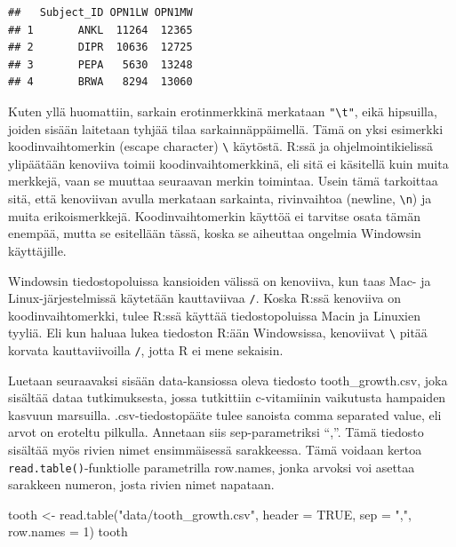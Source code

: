 \documentclass[
]{book}
\newenvironment{Shaded}{\begin{snugshade}}{\end{snugshade}}
\newcommand{\AttributeTok}[1]{\textcolor[rgb]{0.77,0.63,0.00}{#1}}
\newcommand{\ConstantTok}[1]{\textcolor[rgb]{0.00,0.00,0.00}{#1}}
\newcommand{\DecValTok}[1]{\textcolor[rgb]{0.00,0.00,0.81}{#1}}
\newcommand{\FunctionTok}[1]{\textcolor[rgb]{0.00,0.00,0.00}{#1}}
\newcommand{\NormalTok}[1]{#1}
\newcommand{\OtherTok}[1]{\textcolor[rgb]{0.56,0.35,0.01}{#1}}
\newcommand{\StringTok}[1]{\textcolor[rgb]{0.31,0.60,0.02}{#1}}
\begin{document}
\begin{verbatim}
##   Subject_ID OPN1LW OPN1MW
## 1       ANKL  11264  12365
## 2       DIPR  10636  12725
## 3       PEPA   5630  13248
## 4       BRWA   8294  13060
\end{verbatim}

Kuten yllä huomattiin, sarkain erotinmerkkinä merkataan \texttt{"\textbackslash{}t"}, eikä hipsuilla, joiden sisään laitetaan tyhjää tilaa sarkainnäppäimellä. Tämä on yksi esimerkki koodinvaihtomerkin (escape character) \texttt{\textbackslash{}} käytöstä. R:ssä ja ohjelmointikielissä ylipäätään kenoviiva toimii koodinvaihtomerkkinä, eli sitä ei käsitellä kuin muita merkkejä, vaan se muuttaa seuraavan merkin toimintaa. Usein tämä tarkoittaa sitä, että kenoviivan avulla merkataan sarkainta, rivinvaihtoa (newline, \texttt{\textbackslash{}n}) ja muita erikoismerkkejä. Koodinvaihtomerkin käyttöä ei tarvitse osata tämän enempää, mutta se esitellään tässä, koska se aiheuttaa ongelmia Windowsin käyttäjille.

Windowsin tiedostopoluissa kansioiden välissä on kenoviiva, kun taas Mac- ja Linux-järjestelmissä käytetään kauttaviivaa \texttt{/}. Koska R:ssä kenoviiva on koodinvaihtomerkki, tulee R:ssä käyttää tiedostopoluissa Macin ja Linuxien tyyliä. Eli kun haluaa lukea tiedoston R:ään Windowsissa, kenoviivat \texttt{\textbackslash{}} pitää korvata kauttaviivoilla \texttt{/}, jotta R ei mene sekaisin.

Luetaan seuraavaksi sisään data-kansiossa oleva tiedosto tooth\_growth.csv, joka sisältää dataa tutkimuksesta, jossa tutkittiin c-vitamiinin vaikutusta hampaiden kasvuun marsuilla. .csv-tiedostopääte tulee sanoista comma separated value, eli arvot on eroteltu pilkulla. Annetaan siis sep-parametriksi ``,''. Tämä tiedosto sisältää myös rivien nimet ensimmäisessä sarakkeessa. Tämä voidaan kertoa \texttt{read.table()}-funktiolle parametrilla row.names, jonka arvoksi voi asettaa sarakkeen numeron, josta rivien nimet napataan.

\begin{Shaded}
\begin{Highlighting}[]
\NormalTok{tooth }\OtherTok{\textless{}{-}} \FunctionTok{read.table}\NormalTok{(}\StringTok{"data/tooth\_growth.csv"}\NormalTok{, }\AttributeTok{header =} \ConstantTok{TRUE}\NormalTok{, }\AttributeTok{sep =} \StringTok{","}\NormalTok{, }\AttributeTok{row.names =} \DecValTok{1}\NormalTok{)}
\NormalTok{tooth}
\end{Highlighting}
\end{Shaded}
\end{document}
